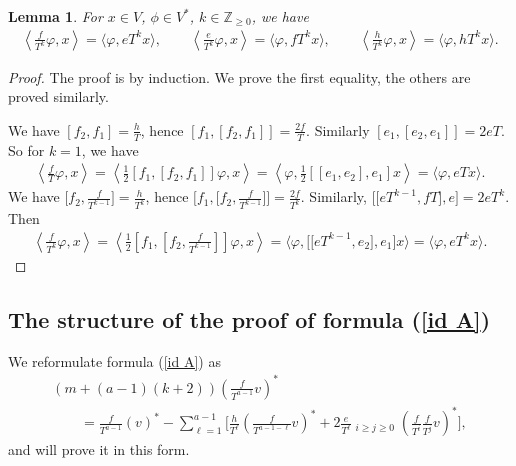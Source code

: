 \documentclass[pdftex]{sigma}
\numberwithin{equation}{section}
\newtheorem{lem}[thm]{Lemma}
\begin{document}
\begin{lem} \label{lem pere} For $x\in V$, $\phi\in V^*$, $k\in{\mathbb Z}_{\geq 0}$, we have
\begin{gather*}
\left\langle \frac{f}{T^k} \varphi, x \right\rangle = \big\langle \varphi, eT^k x \big\rangle,
 \qquad \left\langle \frac{e}{T^k} \varphi, x \right\rangle = \big\langle \varphi, fT^k x \big\rangle, \qquad
\left\langle \frac{h}{T^k} \varphi, x \right\rangle = \big\langle \varphi, hT^k x \big\rangle. %
\end{gather*}
\end{lem}
\begin{proof}The proof is by induction. We prove the first equality, the others are proved similarly.

We have $[f_2, f_1] = \frac{h}{T}$, hence $[f_1, [f_2, f_1]] = \frac{2f}{T}$. Similarly
 $[e_1, [e_2, e_1]] = 2e T$. So for $k=1$, we have
\begin{gather*}
\left\langle \frac{f}{T} \varphi, x \right\rangle = \left\langle \frac{1}{2} [f_1, [f_2, f_1]] \varphi, x \right\rangle = \left\langle \varphi, \frac{1}{2} [[e_1, e_2], e_1] x \right\rangle = \langle \varphi, eT x \rangle.
\end{gather*}
We have $\big[f_2, \frac{f}{T^{k-1}}\big] = \frac{h}{T^k}$, hence $\big[f_1, \big[f_2, \frac{f}{T^{k-1}} \big]\big] = \frac{2f}{T^k}$. Similarly, $\big[\big[eT^{k-1},fT\big], e\big] = 2e T^k$. Then
\begin{gather*}
\left\langle \frac{f}{T^k} \varphi, x \right\rangle = \left\langle \frac 12 \left[f_1, \left[f_2, \frac{f}{T^{k-1}}\right]\right] \varphi, x \right\rangle = \big\langle \varphi, \big[\big[eT^{k-1},e_2\big], e_1\big] x \big\rangle = \big\langle \varphi, eT^k x \big\rangle.\tag*{\qed}
\end{gather*}\renewcommand{\qed}{}
\end{proof}


\subsection{The structure of the proof of formula (\ref{id A})}\label{subsec structure} We reformulate formula (\ref{id A}) as
\begin{gather}
(m+(a-1)(k+2))\left(\frac{f}{T^{a-1}}v\right)^* \nonumber\\
\qquad{} =\frac{f}{T^{a-1}} (v)^* - \sum_{\ell=1}^{a-1}\bigg[\frac{h}{T^\ell}\left(\frac{f}{T^{a-1-\ell}}v\right)^* + 2 \frac{e}{T^\ell}\mathop{\sum_{i+j=a-1-\ell}}_{i\geq j\geq 0} \left(\frac{f}{T^i}\frac{f}{T^j}v\right)^*\bigg], \label{AA}
\end{gather}
and will prove it in this form.
\end{document}
